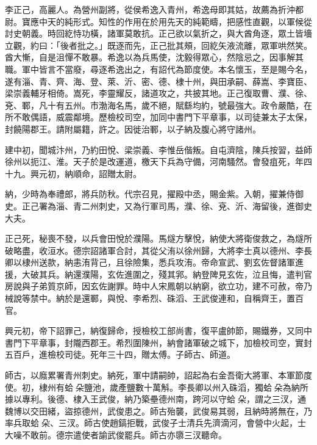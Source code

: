 
\begin{pinyinscope}

 李正己，高麗人。為營州副將，從侯希逸入青州，希逸母即其姑，故薦為折沖都尉。寶應中天的純形式。知性的作用在於用先天的純範疇，把感性直觀，以軍候從討史朝義。時回紇恃功橫，諸軍莫敢抗。正己欲以氣折之，與大酋角逐，眾土皆墻立觀，約曰：「後者批之。」既逐而先，正己批其頰，回紇矢液流離，眾軍哄然笑。酋大慚，自是沮憚不敢暴。希逸以為兵馬使，沈毅得眾心，然陰忌之，因事解其職。軍中皆言不當廢，尋逐希逸出之，有詔代為節度使。本名懷玉，至是賜今名，遂有淄、青、齊、海、登、萊、沂、密、德、棣十州，與田承嗣、薛嵩、李寶臣、梁崇義輔牙相倚。嵩死，李靈耀反，諸道攻之，共披其地。正己復取曹、濮、徐、兗、鄆，凡十有五州。市渤海名馬，歲不絕，賦繇均約，號最強大。政令嚴酷，在所不敢偶語，威震鄰境。歷檢校司空，加同中書門下平章事，以司徒兼太子太保，封饒陽郡王。請附屬籍，許之。因徙治鄆，以子納及腹心將守諸州。



 建中初，聞城汴州，乃約田悅、梁崇義、李惟岳偕叛。自屯濟陰，陳兵按習，益師徐州以扼江、淮。天子於是改運道，檄天下兵為守備，河南騷然。會發疽死，年四十九。興元初，納順命，詔贈太尉。



 納，少時為奉禮郎，將兵防秋。代宗召見，擢殿中丞，賜金紫。入朝，擢兼侍御史。正己署為淄、青二州刺史，又為行軍司馬，濮、徐、兗、沂、海留後，進御史大夫。



 正己死，秘喪不發，以兵會田悅於濮陽。馬燧方擊悅，納使大將衛俊救之，為燧所破略盡，收洹水。德宗詔諸軍合討，其從父洧以徐州歸，大將李士真以德州、李長卿以棣州送款，納恚洧背己，且徐險集，悉兵攻洧。帝命宣武、劉玄佐督諸軍進援，大破其兵。納還濮陽，玄佐進圍之，殘其郛。納登陴見玄佐，泣且悔，遣判官房說與子弟質京師，因玄佐謝罪。時中人宋鳳朝以納窮，欲立功，建不可赦，帝乃械說等禁中。納於是還鄆，與悅、李希烈、硃滔、王武俊連和，自稱齊王，置百官。



 興元初，帝下詔罪己，納復歸命，授檢校工部尚書，復平盧帥節，賜鐵券，又同中書門下平章事，封隴西郡王。希烈圍陳州，納會諸軍破之城下，加檢校司空，實封五百戶，進檢校司徒。死年三十四，贈太傅。子師古、師道。



 師古，以廕累署青州刺史。納死，軍中請嗣帥，詔起為右金吾衛大將軍、本軍節度使。初，棣州有蛤朵鹽池，歲產鹽數十萬斛。李長卿以州入硃滔，獨蛤朵為納所據以專利。後德、棣入王武俊，納乃築壘德州南，跨河以守蛤朵，謂之三汊，通魏博以交田緒，盜掠德州，武俊患之。師古殆襲，武俊易其弱，且納時將無在，乃率兵取蛤朵、三汊。師古使趙鎬拒戰，武俊子士清兵先濟滴河，會營中火起，士大噪不敢前。德宗遣使者諭武俊罷兵。師古亦隳三汊聽命。




\end{pinyinscope}
